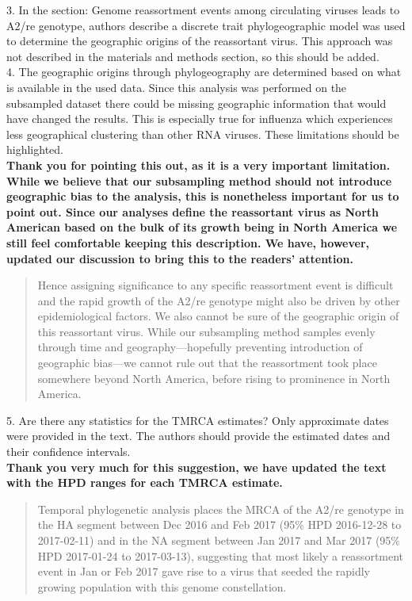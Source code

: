\documentclass[11pt,oneside,letterpaper]{article}
\begin{document}
3. In the section: Genome reassortment events among circulating viruses leads to A2/re genotype, authors describe a discrete trait phylogeographic model was used to determine the geographic origins of the reassortant virus. This approach was not described in the materials and methods section, so this should be added.\\

4. The geographic origins through phylogeography are determined based on what is available in the used data. Since this analysis was performed on the subsampled dataset there could be missing geographic information that would have changed the results. This is especially true for influenza which experiences less geographical clustering than other RNA viruses. These limitations should be highlighted.\\

\textbf{Thank you for pointing this out, as it is a very important limitation. While we believe that our subsampling method should not introduce geographic bias to the analysis, this is nonetheless important for us to point out. Since our analyses define the reassortant virus as North American based on the bulk of its growth being in North America we still feel comfortable keeping this description. We have, however, updated our discussion to bring this to the readers' attention.}

\begin{quotation}
  Hence assigning significance to any specific reassortment event is difficult and the rapid growth of the A2/re genotype might also be driven by other epidemiological factors.
  We also cannot be sure of the geographic origin of this reassortant virus.
  While our subsampling method samples evenly through time and geography---hopefully preventing introduction of geographic bias---we cannot rule out that the reassortment took place somewhere beyond North America, before rising to prominence in North America.
\end{quotation}

5. Are there any statistics for the TMRCA estimates? Only approximate dates were provided in the text. The authors should provide the estimated dates and their confidence intervals.\\

\textbf{Thank you very much for this suggestion, we have updated the text with the HPD ranges for each TMRCA estimate.}

\begin{quotation}
  Temporal phylogenetic analysis places the MRCA of the A2/re genotype in the HA segment between Dec 2016 and Feb 2017 (95\% HPD 2016-12-28 to 2017-02-11) and in the NA segment between Jan 2017 and Mar 2017 (95\% HPD 2017-01-24 to 2017-03-13), suggesting that most likely a reassortment event in Jan or Feb 2017 gave rise to a virus that seeded the rapidly growing population with this genome constellation.
\end{quotation}
\end{document}
